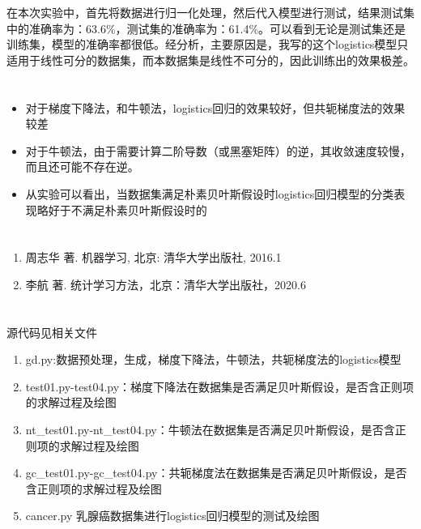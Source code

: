 \documentclass[lang=cn,a4paper,cite=authoryear]{elegantpaper}
\begin{document}
在本次实验中，首先将数据进行归一化处理，然后代入模型进行测试，结果测试集中的准确率为：63.6\%，测试集的准确率为：61.4\%。可以看到无论是测试集还是训练集，模型的准确率都很低。经分析，主要原因是，我写的这个logistics模型只适用于线性可分的数据集，而本数据集是线性不可分的，因此训练出的效果极差。

\section*{}
\begin{itemize}
\item  对于梯度下降法，和牛顿法，logistics回归的效果较好，但共轭梯度法的效果较差
\item  对于牛顿法，由于需要计算二阶导数（或黑塞矩阵）的逆，其收敛速度较慢，而且还可能不存在逆。
\item  从实验可以看出，当数据集满足朴素贝叶斯假设时logistics回归模型的分类表现略好于不满足朴素贝叶斯假设时的
\end{itemize}
\section*{}
\begin{enumerate}[(1)]
\item  周志华 著. 机器学习, 北京: 清华大学出版社, 2016.1
\item  李航 著. 统计学习方法，北京：清华大学出版社，2020.6
\end{enumerate}
\section*{}
源代码见相关文件
\begin{enumerate}[(1)]
	\item  gd.py:数据预处理，生成，梯度下降法，牛顿法，共轭梯度法的logistics模型
	\item  test01.py-test04.py：梯度下降法在数据集是否满足贝叶斯假设，是否含正则项的求解过程及绘图
	\item  nt\_test01.py-nt\_test04.py：牛顿法在数据集是否满足贝叶斯假设，是否含正则项的求解过程及绘图
	\item  gc\_test01.py-gc\_test04.py：共轭梯度法在数据集是否满足贝叶斯假设，是否含正则项的求解过程及绘图
	\item  cancer.py 乳腺癌数据集进行logistics回归模型的测试及绘图
\end{enumerate}
\end{document}
